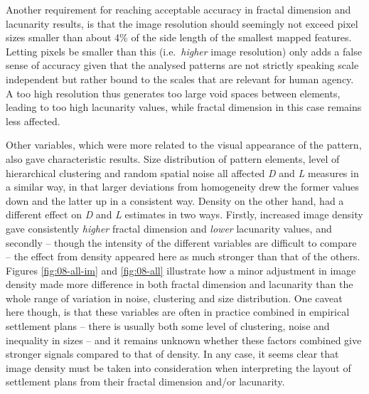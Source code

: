 \documentclass[
  12pt,
]{book}
\begin{document}
Another requirement for reaching acceptable accuracy in fractal dimension and lacunarity results, is that the image resolution should seemingly not exceed pixel sizes smaller than about 4\% of the side length of the smallest mapped features. Letting pixels be smaller than this (i.e.~\emph{higher} image resolution) only adds a false sense of accuracy given that the analysed patterns are not strictly speaking scale independent but rather bound to the scales that are relevant for human agency. A too high resolution thus generates too large void spaces between elements, leading to too high lacunarity values, while fractal dimension in this case remains less affected.

Other variables, which were more related to the visual appearance of the pattern, also gave characteristic results. Size distribution of pattern elements, level of hierarchical clustering and random spatial noise all affected \emph{D} and \emph{L} measures in a similar way, in that larger deviations from homogeneity drew the former values down and the latter up in a consistent way. Density on the other hand, had a different effect on \emph{D} and \emph{L} estimates in two ways. Firstly, increased image density gave consistently \emph{higher} fractal dimension and \emph{lower} lacunarity values, and secondly -- though the intensity of the different variables are difficult to compare -- the effect from density appeared here as much stronger than that of the others. Figures \ref{fig:08-all-im} and \ref{fig:08-all} illustrate how a minor adjustment in image density made more difference in both fractal dimension and lacunarity than the whole range of variation in noise, clustering and size distribution. One caveat here though, is that these variables are often in practice combined in empirical settlement plans -- there is usually both some level of clustering, noise and inequality in sizes -- and it remains unknown whether these factors combined give stronger signals compared to that of density. In any case, it seems clear that image density must be taken into consideration when interpreting the layout of settlement plans from their fractal dimension and/or lacunarity.
\end{document}
